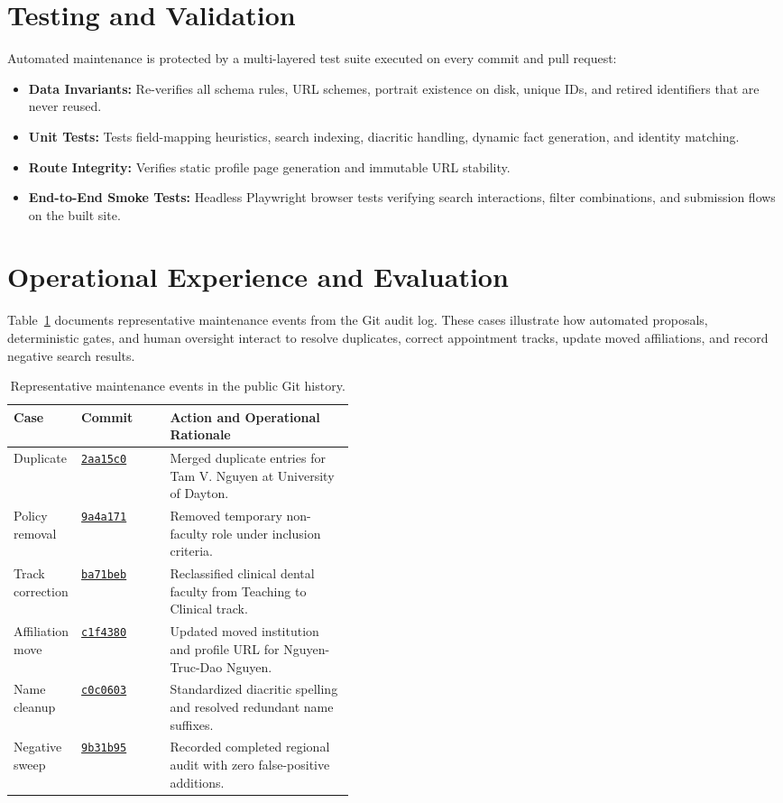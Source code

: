 \documentclass[11pt]{article}
\newcommand{\code}[1]{\texttt{\small #1}}
\newcommand{\ghrepo}{https://github.com/dynaroars/vietprofs}
\newcommand{\commitlink}[1]{\href{\ghrepo/commit/#1}{\code{#1}}}
\begin{document}
\section{Testing and Validation}
\label{sec:testing}
Automated maintenance is protected by a multi-layered test suite executed on every commit and pull request:
\begin{itemize}
\item \textbf{Data Invariants:} Re-verifies all schema rules, URL schemes, portrait existence on disk, unique IDs, and retired identifiers that are never reused.
\item \textbf{Unit Tests:} Tests field-mapping heuristics, search indexing, diacritic handling, dynamic fact generation, and identity matching.
\item \textbf{Route Integrity:} Verifies static profile page generation and immutable URL stability.
\item \textbf{End-to-End Smoke Tests:} Headless Playwright browser tests verifying search interactions, filter combinations, and submission flows on the built site.
\end{itemize}

\section{Operational Experience and Evaluation}
Table~\ref{tab:cases} documents representative maintenance events from the Git audit log. These cases illustrate how automated proposals, deterministic gates, and human oversight interact to resolve duplicates, correct appointment tracks, update moved affiliations, and record negative search results.

\begin{table}[t]
\centering
\caption{Representative maintenance events in the public Git history.}
\label{tab:cases}
\small
\begin{tabularx}{\linewidth}{@{}p{0.18\linewidth}p{0.26\linewidth}X@{}}
\toprule
Case & Commit & Action and Operational Rationale \\
\midrule
Duplicate & \commitlink{2aa15c0} & Merged duplicate entries for Tam V. Nguyen at University of Dayton. \\
Policy removal & \commitlink{9a4a171} & Removed temporary non-faculty role under inclusion criteria. \\
Track correction & \commitlink{ba71beb} & Reclassified clinical dental faculty from Teaching to Clinical track. \\
Affiliation move & \commitlink{c1f4380} & Updated moved institution and profile URL for Nguyen-Truc-Dao Nguyen. \\
Name cleanup & \commitlink{c0c0603} & Standardized diacritic spelling and resolved redundant name suffixes. \\
Negative sweep & \commitlink{9b31b95} & Recorded completed regional audit with zero false-positive additions. \\
\bottomrule
\end{tabularx}
\end{table}
\end{document}
